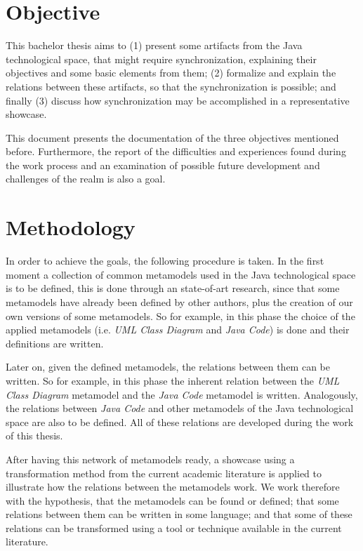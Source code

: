 \documentclass[tuberlin,cic,tc,english,noabntcite]{iiufrgs}
\begin{document}
\section{Objective}
This bachelor thesis aims to (1) present some artifacts from the Java technological space, that might require synchronization, explaining their objectives and some basic elements from them; (2) formalize and explain the relations between these artifacts, so that the synchronization is possible; and finally (3) discuss how synchronization may be accomplished in a representative showcase.

This document presents the documentation of the three objectives mentioned before. Furthermore, the report of the difficulties and experiences found during the work process and an examination of possible future development and challenges of the realm is also a goal.


\section{Methodology}
In order to achieve the goals, the following procedure is taken. In the first moment a collection of common metamodels used in the Java technological space is to be defined, this is done through an state-of-art research, since that some metamodels have already been defined by other authors, plus the creation of our own versions of some metamodels. So for example, in this phase the choice of the applied metamodels (i.e. \emph{UML Class Diagram} and \emph{Java Code}) is done and their definitions are written.

Later on, given the defined metamodels, the relations between them can be written. So for example, in this phase the inherent relation between the \emph{UML Class Diagram} metamodel and the \emph{Java Code} metamodel is written. Analogously, the relations between \emph{Java Code} and other metamodels of the Java technological space are also to be defined. All of these relations are developed during the work of this thesis.

After having this network of metamodels ready, a showcase using a transformation method from the current academic literature is applied to illustrate how the relations between the metamodels work. We work therefore with the hypothesis, that the metamodels can be found or defined; that some relations between them can be written in some language; and that some of these relations can be transformed using a tool or technique available in the current literature.
\end{document}
